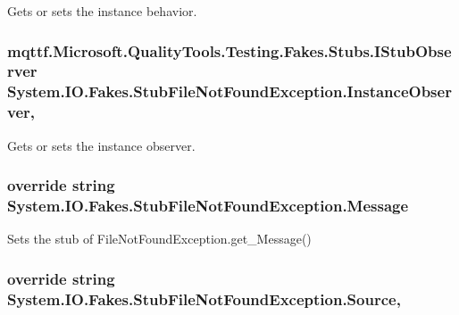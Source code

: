 Gets or sets the instance behavior.

\hypertarget{class_system_1_1_i_o_1_1_fakes_1_1_stub_file_not_found_exception_a8274d4d7c606469f9f691d607cd5ae06}{
\subsubsection[{Instance\-Observer}]{\setlength{\rightskip}{0pt plus 5cm}mqttf.\-Microsoft.\-Quality\-Tools.\-Testing.\-Fakes.\-Stubs.\-I\-Stub\-Observer System.\-I\-O.\-Fakes.\-Stub\-File\-Not\-Found\-Exception.\-Instance\-Observer\hspace{0.3cm}{\ttfamily [get]}, {\ttfamily [set]}}}\label{class_system_1_1_i_o_1_1_fakes_1_1_stub_file_not_found_exception_a8274d4d7c606469f9f691d607cd5ae06}


Gets or sets the instance observer.

\hypertarget{class_system_1_1_i_o_1_1_fakes_1_1_stub_file_not_found_exception_af31a8a8752e4bc80b2d838b35fe85303}{
\subsubsection[{Message}]{\setlength{\rightskip}{0pt plus 5cm}override string System.\-I\-O.\-Fakes.\-Stub\-File\-Not\-Found\-Exception.\-Message\hspace{0.3cm}{\ttfamily [get]}}}\label{class_system_1_1_i_o_1_1_fakes_1_1_stub_file_not_found_exception_af31a8a8752e4bc80b2d838b35fe85303}


Sets the stub of File\-Not\-Found\-Exception.\-get\-\_\-\-Message()

\hypertarget{class_system_1_1_i_o_1_1_fakes_1_1_stub_file_not_found_exception_ae63572c452a46ff7b68544c24cd843ec}{
\subsubsection[{Source}]{\setlength{\rightskip}{0pt plus 5cm}override string System.\-I\-O.\-Fakes.\-Stub\-File\-Not\-Found\-Exception.\-Source\hspace{0.3cm}{\ttfamily [get]}, {\ttfamily [set]}}}\label{class_system_1_1_i_o_1_1_fakes_1_1_stub_file_not_found_exception_ae63572c452a46ff7b68544c24cd843ec}


